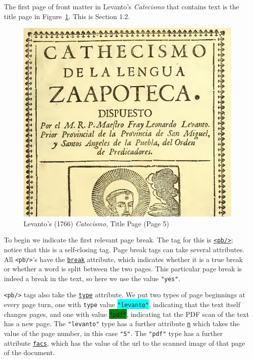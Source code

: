 \documentclass[12pt,a4paper]{article}
\begin{document}
The first page of front matter in Levanto's \emph{Catecismo} that contains text is the title page in Figure~\ref{fig:levanto1766_TitlePage}.  This is Section 1.2.

\begin{figure}[h]
\centerline{\includegraphics[scale=0.35]{Levanto1766_TitlePage} }
\caption{Levanto's (1766) \emph{Catecismo}, Title Page (Page 5)}
\label{fig:levanto1766_TitlePage}
\end{figure}

To begin we indicate the first relevant page break.  The tag for this is \hyperref[tag-sec:pb]{\texttt{<pb/>}}; notice that this is a self-closing tag.  Page break tags can take several attributes.  All \texttt{<pb/>}'s have the \hyperref[att-sec:break]{\texttt{break}} attribute, which indicates whether it is a true break or whether a word is split between the two pages.  This particular page break is indeed a break in the text, so here we use the value \texttt{"yes"}.

\texttt{<pb/>} tags also take the \hyperref[att-sec:type]{\texttt{type}} attribute.  We put two types of page beginnings at every page turn, one with \texttt{type} value \colorbox{cyan}{\texttt{"levanto"}}, indicating that the text itself changes pages, and one with value \colorbox{green}{\texttt{"pdf"}}, indicating tat the PDF scan of the text has a new page.  The \texttt{"levanto"} type has a further attribute \hyperref[att-sec:n]{\texttt{n}} which takes the value of the page number, in this case \texttt{"5"}.  The \texttt{"pdf"} type has a further attribute \hyperref[att-sec:facs]{\texttt{facs}}, which has the value of the url to the scanned image of that page of the document.
\end{document}
